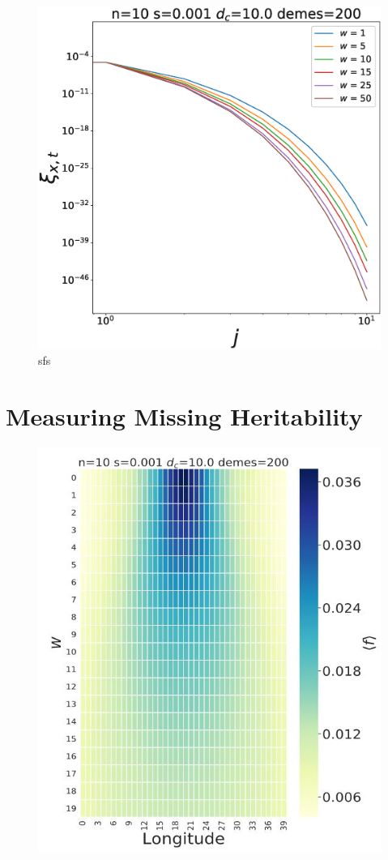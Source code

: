 \begin{figure}[h]
    \centering
    \includegraphics[scale=0.3]{img/fig4.eps}
    \caption{sfs}
    \label{fig:}
\end{figure}


\section{Measuring Missing Heritability}

\begin{figure}[h]
    \centering
    \includegraphics[scale=0.3]{img/sampling_heatmap.JPG}
    \caption{}
    \label{fig:}
\end{figure}


